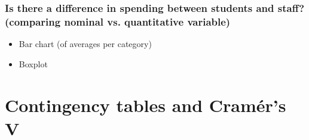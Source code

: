\documentclass{beamer}
\begin{document}
\begin{frame}
  \frametitle{Is there a difference in spending between students and staff? (comparing nominal vs. quantitative variable)}
  \begin{itemize}
    \item \alert<1>{Bar chart} (of averages per category)
    \item \alert<2>{Boxplot}
  \end{itemize}

  \begin{figure}
    \centering
  \end{figure}

\end{frame}

\section{Contingency tables and Cramér's V}
\sectionframelogo{}
\end{document}
